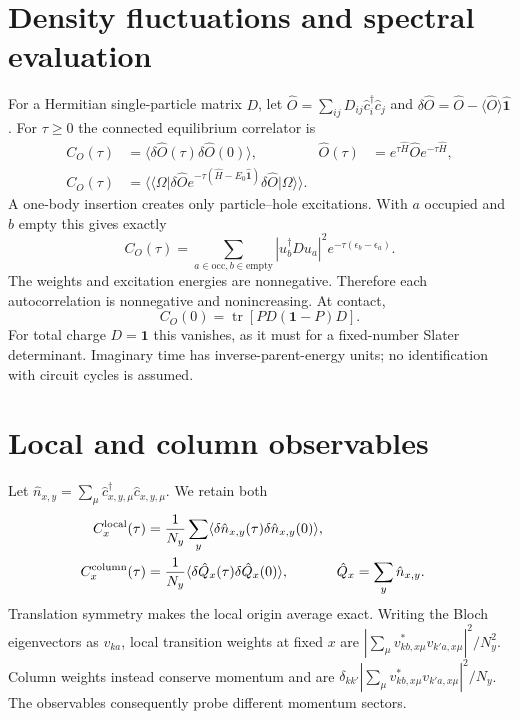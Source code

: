 \documentclass[aps,prb,onecolumn,nofootinbib,superscriptaddress]{revtex4-2}
\begin{document}
\section{Density fluctuations and spectral evaluation}
For a Hermitian single-particle matrix $D$, let
$\hat O=\sum_{ij}D_{ij}\hat c_i^\dagger\hat c_j$ and
$\delta\hat O=\hat O-\langle\hat O\rangle\hat{\mathbf{1}}$.
For $\tau\geq0$ the connected equilibrium correlator is
\begin{align}
 C_O(\tau)&=\langle\delta\hat O(\tau)\delta\hat O(0)\rangle,
 &\hat O(\tau)&=e^{\tau\hat H}\hat Oe^{-\tau\hat H},\\
 C_O(\tau)&=\langle\!\langle\Omega\rvert\delta\hat O
 e^{-\tau(\hat H-E_0\hat{\mathbf{1}})}\delta\hat O
 \lvert\Omega\rangle\!\rangle.
\end{align}
A one-body insertion creates only particle--hole excitations. With $a$ occupied
and $b$ empty this gives exactly
\begin{equation}
 C_O(\tau)=\sum_{a\in\mathrm{occ},b\in\mathrm{empty}}
 |u_b^\dagger D u_a|^2e^{-\tau(\epsilon_b-\epsilon_a)}.
\end{equation}
The weights and excitation energies are nonnegative. Therefore each
autocorrelation is nonnegative and nonincreasing. At contact,
\begin{equation}
 C_O(0)=\operatorname{tr}[PD(\mathbf{1}-P)D].
\end{equation}
For total charge $D=\mathbf{1}$ this vanishes, as it must for a fixed-number
Slater determinant. Imaginary time has inverse-parent-energy units; no
identification with circuit cycles is assumed.

\section{Local and column observables}
Let $\hat n_{x,y}=\sum_\mu\hat c_{x,y,\mu}^\dagger\hat c_{x,y,\mu}$.
We retain both
\begin{align}
 C_x^{\rm local}(\tau)&=\frac1{N_y}\sum_y
 \langle\delta\hat n_{x,y}(\tau)\delta\hat n_{x,y}(0)\rangle,\\
 C_x^{\rm column}(\tau)&=\frac1{N_y}
 \langle\delta\hat Q_x(\tau)\delta\hat Q_x(0)\rangle,
 &\hat Q_x&=\sum_y\hat n_{x,y}.
\end{align}
Translation symmetry makes the local origin average exact. Writing the Bloch
eigenvectors as $v_{ka}$, local transition weights at fixed $x$ are
$|\sum_\mu v_{kb,x\mu}^*v_{k'a,x\mu}|^2/N_y^2$.
Column weights instead conserve momentum and are
$\delta_{kk'}|\sum_\mu v_{kb,x\mu}^*v_{k'a,x\mu}|^2/N_y$.
The observables consequently probe different momentum sectors.
\end{document}
